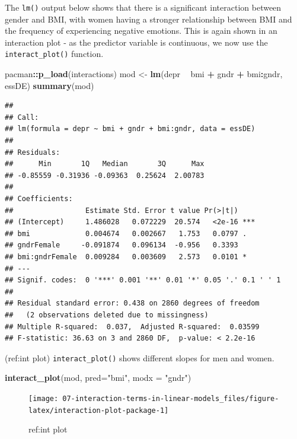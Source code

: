 \documentclass[
]{book}
\newenvironment{Shaded}{\begin{snugshade}}{\end{snugshade}}
\newcommand{\DataTypeTok}[1]{\textcolor[rgb]{0.13,0.29,0.53}{#1}}
\newcommand{\KeywordTok}[1]{\textcolor[rgb]{0.13,0.29,0.53}{\textbf{#1}}}
\newcommand{\NormalTok}[1]{#1}
\newcommand{\OperatorTok}[1]{\textcolor[rgb]{0.81,0.36,0.00}{\textbf{#1}}}
\newcommand{\StringTok}[1]{\textcolor[rgb]{0.31,0.60,0.02}{#1}}
\begin{document}
The \texttt{lm()} output below shows that there is a significant interaction between gender and BMI, with women having a stronger relationship between BMI and the frequency of experiencing negative emotions. This is again shown in an interaction plot - as the predictor variable is continuous, we now use the \texttt{interact\_plot()} function.

\begin{Shaded}
\begin{Highlighting}[]
\NormalTok{pacman}\OperatorTok{::}\KeywordTok{p_load}\NormalTok{(interactions)}
\NormalTok{mod <-}\StringTok{ }\KeywordTok{lm}\NormalTok{(depr }\OperatorTok{~}\StringTok{ }\NormalTok{bmi }\OperatorTok{+}\StringTok{ }\NormalTok{gndr }\OperatorTok{+}\StringTok{ }\NormalTok{bmi}\OperatorTok{:}\NormalTok{gndr, essDE)}
\KeywordTok{summary}\NormalTok{(mod)}
\end{Highlighting}
\end{Shaded}

\begin{verbatim}
## 
## Call:
## lm(formula = depr ~ bmi + gndr + bmi:gndr, data = essDE)
## 
## Residuals:
##      Min       1Q   Median       3Q      Max 
## -0.85559 -0.31936 -0.09363  0.25624  2.00783 
## 
## Coefficients:
##                 Estimate Std. Error t value Pr(>|t|)    
## (Intercept)     1.486028   0.072229  20.574   <2e-16 ***
## bmi             0.004674   0.002667   1.753   0.0797 .  
## gndrFemale     -0.091874   0.096134  -0.956   0.3393    
## bmi:gndrFemale  0.009284   0.003609   2.573   0.0101 *  
## ---
## Signif. codes:  0 '***' 0.001 '**' 0.01 '*' 0.05 '.' 0.1 ' ' 1
## 
## Residual standard error: 0.438 on 2860 degrees of freedom
##   (2 observations deleted due to missingness)
## Multiple R-squared:  0.037,	Adjusted R-squared:  0.03599 
## F-statistic: 36.63 on 3 and 2860 DF,  p-value: < 2.2e-16
\end{verbatim}

(ref:int plot) \texttt{interact\_plot()} shows different slopes for men and women.

\begin{Shaded}
\begin{Highlighting}[]
\KeywordTok{interact_plot}\NormalTok{(mod, }\DataTypeTok{pred=}\StringTok{"bmi"}\NormalTok{, }\DataTypeTok{modx =} \StringTok{"gndr"}\NormalTok{)}
\end{Highlighting}
\end{Shaded}

\begin{figure}

{\centering \texttt{[image: 07-interaction-terms-in-linear-models\_files/figure-latex/interaction-plot-package-1]} 

}

\caption{ref:int plot}\label{fig:interaction-plot-package}
\end{figure}
\end{document}
